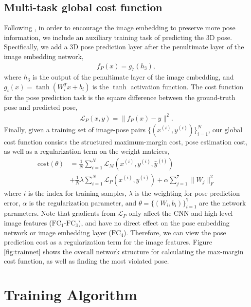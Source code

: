 \documentclass[10pt,twocolumn,letterpaper]{article}
\begin{document}
\subsection{Multi-task global cost function}
\vspace{-0.05in}
Following \cite{accv2014, hmlpeijcv},  in order to encourage the image embedding to preserve more pose information, we include an auxiliary training task of predicting the 3D pose.
Specifically, we add a 3D pose prediction layer after the penultimate layer of the image embedding network,
\begin{align}
f_{P}(x) = g_7(h_3),
\end{align}
where $h_3$ is the output of the penultimate layer of the image embedding, and $g_i(x)=\tanh(W_i^Tx+b_i)$ is the $\tanh$ activation function.
The cost function for the pose prediction task is the square difference between the ground-truth pose and predicted pose, 
\begin{align}
\label{eqn:costpredictpose}
\mathcal{L}_{P}(x, y) = \| f_{P}(x) - y\|^{2}.
\end{align}
Finally, given a training set of image-pose pairs $\{(x^{(i)}, y^{(i)})\}_{i=1}^N$,  our global cost function consists the structured maximum-margin cost,  pose estimation cost, as well as a regularization term on the weight matrices,
\begin{equation}
\begin{split}
\text{cost}(\theta) &= \frac{1}{N} \sum_{i=1}^{N} \mathcal{L}_{M}(x^{(i)},y^{(i)}, \hat{y}^{(i)}) 
\\
& + \frac{1}{N}\lambda\sum_{i=1}^{N} \mathcal{L}_{P}(x^{(i)}, y^{(i)}) 
+ \alpha\sum_{j=1}^7 \|W_j\|^2_F
\end{split}
\end{equation} 
where $i$ is the index for training samples,  $\lambda$ is the weighting for pose prediction error, $\alpha$ is the regularization parameter, and $\theta=\{(W_i,b_i)\}_{i=1}^7$ are the network parameters.
Note that gradients from $\mathcal{L}_{P}$ only affect the CNN and high-level image features ($\text{FC}_{1}$-$\text{FC}_{3}$), and have no direct effect on the pose embedding network or image embedding layer ($\text{FC}_{4}$). Therefore, we can view the pose prediction cost as a regularization term for the image features.
Figure \ref{fig:trainnet} shows the overall network structure for calculating the max-margin cost function, as well as finding the most violated pose.

\section{Training Algorithm} 
\label{sec:Training}
\vspace{-0.1in}
\end{document}
